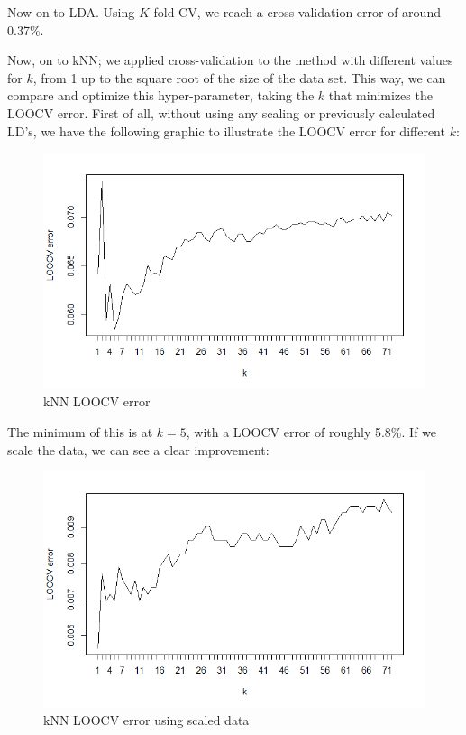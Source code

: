 \documentclass[10pt]{article}
\begin{document}
Now on to LDA. Using $K$-fold CV, we reach a cross-validation error of around 0.37\%.



Now, on to kNN; we applied cross-validation to the method with different values for $k$, from 1 up to the square root of the size of the data set. This way, we can compare and optimize this hyper-parameter, taking the $k$ that minimizes the LOOCV error. First of all, without using any scaling or previously calculated LD's, we have the following graphic to illustrate the LOOCV error for different $k$:
\begin{figure}[H]
\centering
\caption{kNN LOOCV error}
\includegraphics[scale=0.5]{kNN_LOOCV_error}
\end{figure}
The minimum of this is at $k=5$, with a LOOCV error of roughly 5.8\%. If we scale the data, we can see a clear improvement:
\begin{figure}[H]
\centering
\caption{kNN LOOCV error using scaled data}
\includegraphics[scale=0.5]{kNN_scaled_LOOCV_error}
\end{figure}
\end{document}
